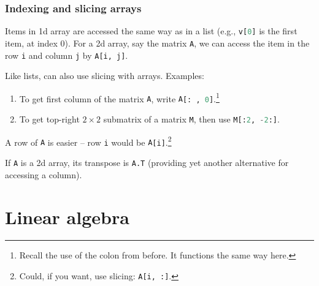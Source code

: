 \documentclass{beamer}
\newenvironment{codeblock}
    {\hfill\begin{beamerboxesrounded}[lower=codecol, width=0.8\textwidth]
    \medskip

    }
    { 
    \end{beamerboxesrounded}\hfill
    }
\theoremstyle{example}
\newcommand{\ct}[1]{\lstinline[language=Python]!#1!}
\newcommand{\ttt}[1]{{\small\texttt{#1}}}
\begin{document}
\begin{frame}
\frametitle{Indexing and slicing arrays}
Items in 1d array are accessed the same way as in a list (e.g., \ttt{v}\ct{[0]} is the first item, at index 0).  For a 2d array, say the matrix \ttt{A}, we can access the item in the row \ct{i} and column \ct{j} by \ttt{A}\ct{[i, j]}.

\vspace*{12pt}
\pause
Like lists, can also use slicing with arrays. Examples:
\begin{enumerate}
    \item To get first column of the matrix \ttt{A}, write \ttt{A}\ct{[: , 0]}.\footnote{Recall the use of the colon from before. It functions the same way here.}
    \pause 
    \item To get top-right $2\times 2$ submatrix of a matrix \ttt{M}, then use \ttt{M}\ct{[:2, -2:]}.
\end{enumerate}




\pause
A row of \ttt{A} is easier {--} row \ct{i} would be \ttt{A}\ct{[i]}.\footnote{Could, if you want, use slicing: \ttt{A}\ct{[i, :]}.}

\pause
If \ttt{A} is a 2d array, its transpose is \ttt{A.T} (providing yet another alternative for accessing a column).
\end{frame}

\section{Linear algebra}
\end{document}
